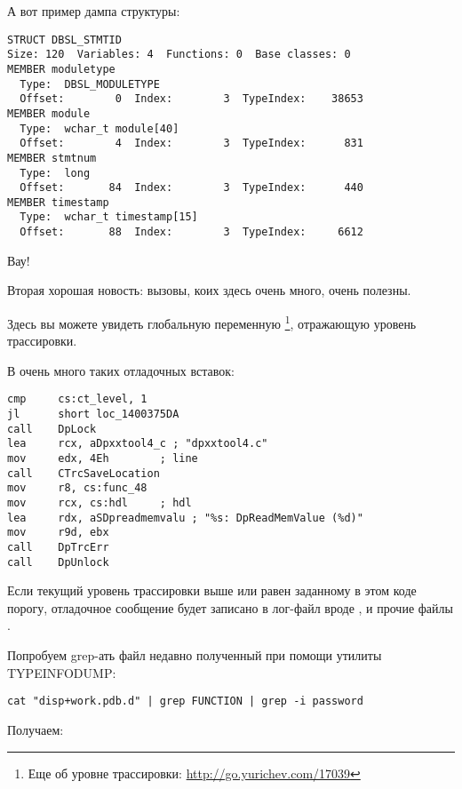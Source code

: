 А вот пример дампа структуры:

\begin{lstlisting}
STRUCT DBSL_STMTID 
Size: 120  Variables: 4  Functions: 0  Base classes: 0
MEMBER moduletype 
  Type:  DBSL_MODULETYPE
  Offset:        0  Index:        3  TypeIndex:    38653
MEMBER module 
  Type:  wchar_t module[40]
  Offset:        4  Index:        3  TypeIndex:      831
MEMBER stmtnum 
  Type:  long
  Offset:       84  Index:        3  TypeIndex:      440
MEMBER timestamp 
  Type:  wchar_t timestamp[15]
  Offset:       88  Index:        3  TypeIndex:     6612
\end{lstlisting}

Вау!

Вторая хорошая новость:  вызовы, коих здесь очень много, очень полезны. 

Здесь вы можете увидеть глобальную переменную \footnote{Еще об уровне трассировки: \url{http://go.yurichev.com/17039}}, отражающую уровень трассировки.

В  очень много таких отладочных вставок:

\begin{lstlisting}
cmp     cs:ct_level, 1
jl      short loc_1400375DA
call    DpLock
lea     rcx, aDpxxtool4_c ; "dpxxtool4.c"
mov     edx, 4Eh        ; line
call    CTrcSaveLocation
mov     r8, cs:func_48
mov     rcx, cs:hdl     ; hdl
lea     rdx, aSDpreadmemvalu ; "%s: DpReadMemValue (%d)"
mov     r9d, ebx
call    DpTrcErr
call    DpUnlock
\end{lstlisting}

Если текущий уровень трассировки выше или равен заданному в этом коде порогу, 
отладочное сообщение будет записано в лог-файл вроде ,  
и прочие файлы .

\myindex{\GrepUsage}
Попробуем grep-ать файл недавно полученный при помощи утилиты TYPEINFODUMP:

\begin{lstlisting}
cat "disp+work.pdb.d" | grep FUNCTION | grep -i password
\end{lstlisting}

Получаем:

